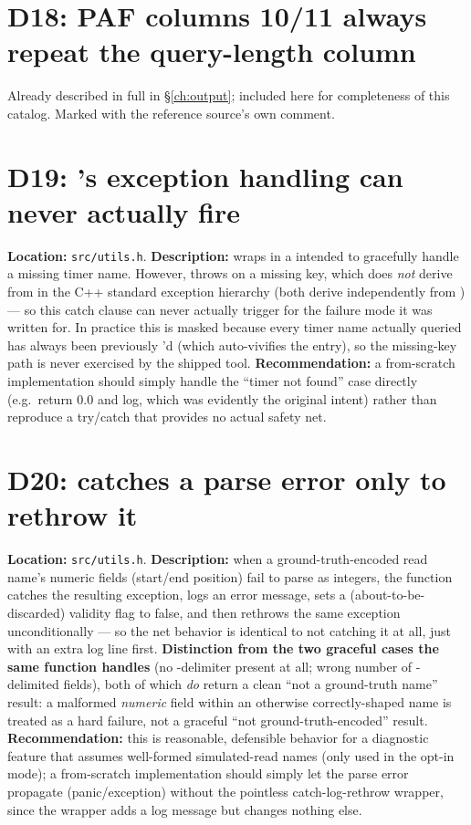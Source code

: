 \section{D18: PAF columns 10/11 always repeat the query-length column}
\label{sec:d18}
Already described in full in \S\ref{ch:output}; included here for completeness of this catalog.
Marked with the reference source's own  comment.

\section{D19: 's exception handling can never actually fire}
\label{sec:d19}
\textbf{Location:} \texttt{src/utils.h}. \textbf{Description:}  wraps
 in a 
intended to gracefully handle a missing timer name. However,  throws
 on a missing key, which does \emph{not} derive from
 in the C++ standard exception hierarchy (both derive independently from
) --- so this catch clause can never actually trigger for the failure mode it
was written for. In practice this is masked because every timer name actually queried has always
been previously 'd (which auto-vivifies the entry), so the missing-key path is
never exercised by the shipped tool. \textbf{Recommendation:} a from-scratch implementation should
simply handle the ``timer not found'' case directly (e.g.\ return $0.0$ and log, which was
evidently the original intent) rather than reproduce a try/catch that provides no actual safety
net.

\section{D20:  catches a parse error only to rethrow it}
\label{sec:d20}
\textbf{Location:} \texttt{src/utils.h}. \textbf{Description:} when a ground-truth-encoded read
name's numeric fields (start/end position) fail to parse as integers, the function catches the
resulting exception, logs an error message, sets a (about-to-be-discarded) validity flag to false,
and then rethrows the same exception unconditionally --- so the net behavior is identical to not
catching it at all, just with an extra log line first. \textbf{Distinction from the two graceful
cases the same function handles} (no \code{!}-delimiter present at all; wrong number of
\code{!}-delimited fields), both of which \emph{do} return a clean ``not a ground-truth name''
result: a malformed \emph{numeric} field within an otherwise correctly-shaped name is treated as a
hard failure, not a graceful ``not ground-truth-encoded'' result. \textbf{Recommendation:}
this is reasonable, defensible behavior for a diagnostic feature that assumes well-formed
simulated-read names (only used in the opt-in  mode); a from-scratch implementation
should simply let the parse error propagate (panic/exception) without the pointless
catch-log-rethrow wrapper, since the wrapper adds a log message but changes nothing else.

